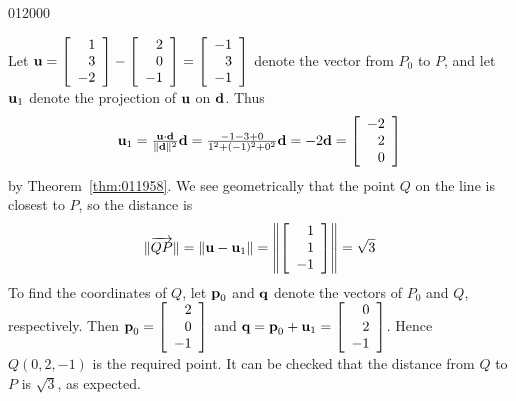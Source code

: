\begin{example}{}{012000}
\begin{solution}
Let 
$\textbf{u} = \left[
\begin{array}{r}
1\\
3 \\
-2
\end{array}
\right]
-
\left[
\begin{array}{r}
2\\
0 \\
-1
\end{array}
\right]
=
\left[
\begin{array}{r}
-1\\
3 \\
-1
\end{array}
\right]$
 denote the vector from $P_{0}$ to $P$, and let $\textbf{u}_{1}$ denote the projection of $\textbf{u}$ on $\textbf{d}$. Thus
\begin{equation*}
\textbf{u}_{1} = \tfrac{\textbf{u} \cdot \textbf{d}}{\| \textbf{d} \|^2}\textbf{d} = \tfrac{-1 - 3 + 0}{1^2 + (-1)^2 + 0^2}\textbf{d} = -2\textbf{d} = 
\left[
\begin{array}{r}
-2\\
2 \\
0
\end{array}
\right]
\end{equation*}
by Theorem~\ref{thm:011958}. We see geometrically that the point $Q$ on the line is closest to $P$, so the distance is
\begin{equation*}
\| \overrightarrow{QP} \| = \| \textbf{u} - \textbf{u}_{1} \| = \left\| 
\left[
\begin{array}{r}
1\\
1 \\
-1
\end{array}
\right] \right\|
= \sqrt{3}
\end{equation*}
To find the coordinates of $Q$, let $\textbf{p}_{0}$ and $\textbf{q}$ denote the vectors of $P_{0}$ and $Q$, respectively. Then $\textbf{p}_{0} = \left[
\begin{array}{r}
2\\
0 \\
-1
\end{array}
\right]$
 and $\textbf{q} = \textbf{p}_{0} + \textbf{u}_{1} = \left[
 \begin{array}{r}
 0\\
 2 \\
 -1
 \end{array}
 \right]$. Hence $Q(0, 2, -1)$ is the required point. It can be checked that the distance from $Q$ to $P$ is $\sqrt{3}$, as expected.
\end{solution}
\end{example}

